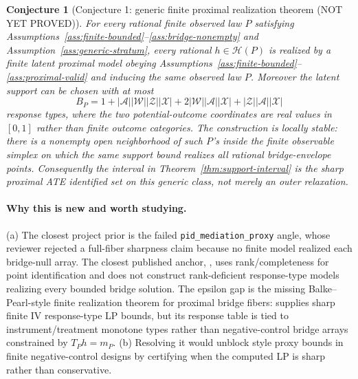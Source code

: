 \documentclass[11pt]{article}
\newcommand{\calH}{\mathcal{H}}
\theoremstyle{definition}
\theoremstyle{plain}
\newtheorem{conjecture}{Conjecture}
\theoremstyle{remark}
\begin{document}
\begin{conjecture}[Conjecture 1: generic finite proximal realization theorem (NOT YET PROVED)]\label{conj:realization}
For every rational finite observed law \(P\) satisfying
Assumptions~\ref{ass:finite-bounded}--\ref{ass:bridge-nonempty} and
Assumption~\ref{ass:generic-stratum}, every rational \(h\in\calH(P)\) is
realized by a finite latent proximal model
obeying Assumptions~\ref{ass:finite-bounded}--\ref{ass:proximal-valid} and
inducing the same observed law \(P\).  Moreover the latent support can be
chosen with at most
\[
B_P
=1+
|\mathcal A||\mathcal W||\mathcal Z||\mathcal X|
+2|\mathcal W||\mathcal A||\mathcal X|
+|\mathcal Z||\mathcal A||\mathcal X|
\]
response types, where the two potential-outcome coordinates are real values
in \([0,1]\) rather than finite outcome categories.  The construction is
locally stable: there is a nonempty
open neighborhood of such \(P\)'s inside the finite observable simplex on
which the same support bound realizes all rational bridge-envelope points.
Consequently the interval in Theorem~\ref{thm:support-interval} is the sharp
proximal ATE identified set on this generic class, not merely an outer
relaxation.
\end{conjecture}
\paragraph{Why this is new and worth studying.}
(a) The closest project prior is the failed \texttt{pid\_mediation\_proxy}
angle, whose reviewer rejected a full-fiber sharpness claim because no finite
model realized each bridge-null array.  The closest published anchor,
\citet{MiaoGengTchetgen2018Biometrika}, uses rank/completeness for point
identification and does not construct rank-deficient response-type models
realizing every bounded bridge solution.  The epsilon gap is the missing
Balke--Pearl-style finite realization theorem for proximal bridge fibers:
\citet{BalkePearl1997JASA} supplies sharp finite IV response-type LP bounds,
but its response table is tied to instrument/treatment monotone types rather
than negative-control bridge arrays constrained by \(T_Ph=m_P\).
(b) Resolving it would unblock \citet{GhassamiShpitserTchetgen2023ProxyPI}
style proxy bounds in finite negative-control designs by certifying when the
computed LP is sharp rather than conservative.
\end{document}
